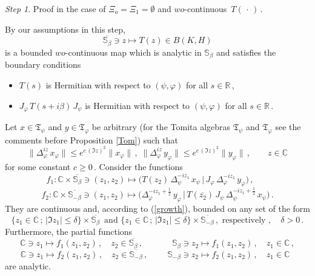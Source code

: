 \documentclass[reqno]{amsart}
\theoremstyle{definition}
\theoremstyle{remark}
\numberwithin{equation}{section}
\theoremstyle{plain}
\begin{document}
\bigskip

{\it Step 1}. {\sc Proof in the case of $\Xi_o =\Xi_1 =\emptyset$
and $wo$-continuous $\, T(\,\cdot\, )\,$.}
\medskip

By our assumptions in this step,
\begin{equation*}
\overline{\mathbb S_\beta}\ni z\longmapsto T(z)\in B(K,H)
\end{equation*}
is a bounded $wo$-continuous map which is analytic in $\mathbb S_\beta$
and satisfies the boundary conditions
\begin{itemize}
\item[(i)] $T(s)$ is Hermitian with respect to $(\psi ,\varphi )$
for all $s\in\mathbb R\,$,
\item[(ii)] $J_\varphi\, T(s+i\beta )\, J_\psi$ is Hermitian with
respect to $(\psi ,\varphi )$ for all $s\in\mathbb R\,$.
\end{itemize}

Let $x\in\mathfrak T_\psi$ and $y\in\mathfrak T_\varphi$ be arbitrary
(for the Tomita algebras $\mathfrak T_\psi$ and $\mathfrak T_\varphi$
see the comments before Proposition \ref{Tom}) such that
\begin{equation}\label{growth}
\|\Delta_\varphi^{i z}\, x_\varphi\|\leq e^{c\, (\Im z)^2} \| x_\varphi\|
\, ,\;\|\Delta_\varphi^{i z}\, y_\varphi\|\leq e^{c\, (\Im z)^2}
\| y_\varphi\|\, ,\qquad z\in\mathbb C
\end{equation}
for some constant $c\geq 0\,$. Consider the functions
\begin{equation*}
f_1 : \mathbb C\times \overline{\mathbb S_\beta}\ni (z_1,z_2)
\longmapsto\big( T(z_2)\,\Delta_\psi^{-i z_1}\, x_\psi\, |\,
J_\varphi\,\Delta_\varphi^{-i z_1}\, y_\varphi\big)\, ,\phantom{xxx}
\end{equation*}
\begin{equation*}
f_2 : \mathbb C\times \overline{\mathbb S_{-\beta}}\ni (z_1,z_2)
\longmapsto\big( \Delta_\varphi^{-i z_1 +\frac 12}\, y_\varphi\, |\,
T(\overline{z_2} )\, J_\psi\,\Delta_\psi^{-i z_1 +\frac 12}\, x_\psi
\big)\, .
\end{equation*}
They are continuous and, according to (\ref{growth}), bounded on
any set of the form
\begin{equation*}
\{ z_1\in\mathbb C\, ;\, |\Im z_1 |\leq\delta \}\times
\overline{\mathbb S_\beta}\,\text{ and }\{ z_1\in\mathbb C\, ;\,
|\Im z_1 |\leq\delta \}\times\overline{\mathbb S_{-\beta}}\, ,
\text{ respectively },\quad \delta >0\, .
\end{equation*}
Furthermore, the partial functions
\begin{equation*}
\mathbb C\ni z_1\longmapsto f_1(z_1,z_2)\, ,\quad z_2\in
\overline{\mathbb S_\beta}\, ,\qquad\;\phantom{xx}
\mathbb S_\beta\ni z_2\longmapsto f_1(z_1,z_2)\, ,\quad z_1\in
\mathbb C\, ,
\end{equation*}
\begin{equation*}
\mathbb C\ni z_1\longmapsto f_2(z_1,z_2)\, ,\quad z_2\in
\overline{\mathbb S_{-\beta}}\, ,\qquad\;
\mathbb S_{-\beta}\ni z_2\longmapsto f_2(z_1,z_2)\, ,\quad z_1\in
\mathbb C\phantom{x}
\end{equation*}
are analytic.
\end{document}
